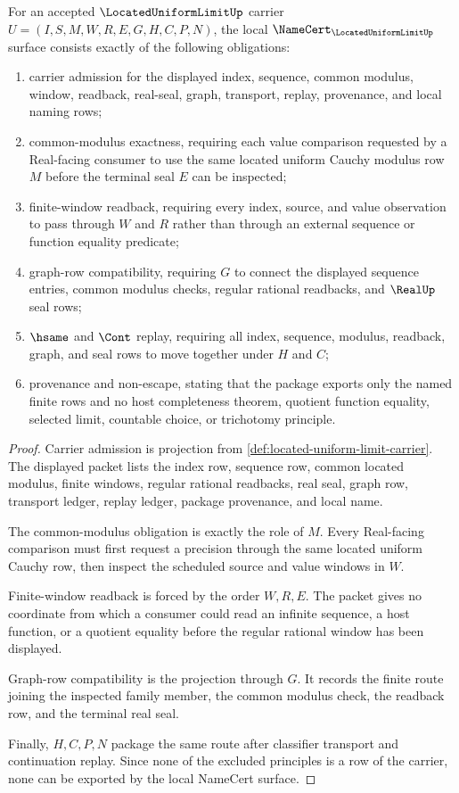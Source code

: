 \begin{theorem}
\label{thm:located-uniform-limit-namecert-obligations}
For an accepted $\LocatedUniformLimitUp$ carrier
$U=(I,S,M,W,R,E,G,H,C,P,N)$, the local
$\NameCert_{\LocatedUniformLimitUp}$ surface consists exactly of the following
obligations:
\begin{enumerate}
\item carrier admission for the displayed index, sequence, common modulus,
  window, readback, real-seal, graph, transport, replay, provenance, and
  local naming rows;
\item common-modulus exactness, requiring each value comparison requested by
  a Real-facing consumer to use the same located uniform Cauchy modulus row
  $M$ before the terminal seal $E$ can be inspected;
\item finite-window readback, requiring every index, source, and value
  observation to pass through $W$ and $R$ rather than through an external
  sequence or function equality predicate;
\item graph-row compatibility, requiring $G$ to connect the displayed
  sequence entries, common modulus checks, regular rational readbacks, and
  $\RealUp$ seal rows;
\item $\hsame$ and $\Cont$ replay, requiring all index, sequence, modulus,
  readback, graph, and seal rows to move together under $H$ and $C$;
\item provenance and non-escape, stating that the package exports only the
  named finite rows and no host completeness theorem, quotient function
  equality, selected limit, countable choice, or trichotomy principle.
\end{enumerate}
\end{theorem}
\begin{proof}
Carrier admission is projection from
\autoref{def:located-uniform-limit-carrier}. The displayed packet lists the
index row, sequence row, common located modulus, finite windows, regular
rational readbacks, real seal, graph row, transport ledger, replay ledger,
package provenance, and local name.

The common-modulus obligation is exactly the role of $M$. Every Real-facing
comparison must first request a precision through the same located uniform
Cauchy row, then inspect the scheduled source and value windows in $W$.

Finite-window readback is forced by the order $W,R,E$. The packet gives no
coordinate from which a consumer could read an infinite sequence, a host
function, or a quotient equality before the regular rational window has been
displayed.

Graph-row compatibility is the projection through $G$. It records the finite
route joining the inspected family member, the common modulus check, the
readback row, and the terminal real seal.

Finally, $H,C,P,N$ package the same route after classifier transport and
continuation replay. Since none of the excluded principles is a row of the
carrier, none can be exported by the local NameCert surface.
\end{proof}

